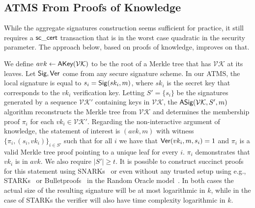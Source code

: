 \subsection{ATMS From Proofs of Knowledge}

While the aggregate signatures construction seems sufficient for practice,
it still requires a $\mathsf{sc\_cert}$ transaction that is in the worst case quadratic in
the security parameter.
The approach below, based on proofs of knowledge, improves on that.

We define $avk \gets \textsf{AKey}(\mathcal{VK})$ to be the root of a Merkle tree
that has $\mathcal{VK}$ at its leaves. Let $\mathsf{Sig}, \mathsf{Ver}$ come from any secure signature
scheme.
In our ATMS, the local signature is equal to $s_i = \mathsf{Sig}(sk_i, m)$, where
$sk_i$ is the secret key that corresponds to the $vk_i$ verification key.
Letting $S' = \{s_i\}$ be the signatures generated by a sequence $\mathcal{VK}'$
containing keys in $\mathcal{VK}$, the $\textsf{ASig}(\mathcal{VK}, S', m)$
algorithm reconstructs the Merkle tree from $\mathcal{VK}$ and determines the
membership proof $\pi_i$ for each $vk_i \in \mathcal{VK}'$. Regarding the
non-interactive argument of knowledge, the statement of interest is $(avk, m)$
with witness $\{\pi_i, (s_i, vk_i)\}_{i\in S'}$ such that for all $i$ we have that
$\mathsf{Ver}(vk_i, m, s_i) = 1$ and $\pi_i$ is a valid Merkle tree proof pointing to a
unique leaf for every $i$. $\pi_i$ demonstrates that $vk_i$ is in $avk$. We also
require $|S'| \geq t$. It is possible to construct succinct proofs for this
statement using SNARKs~\cite{snarks} or even without any trusted setup
using e.g., STARKs~\cite{ben2017scalable} or
Bulletproofs~\cite{bulletproofs} in the Random Oracle
model~\cite{ro}. In both cases the actual size of the resulting
signature will be at most logarithmic in $k$, while in the case of STARKs the
verifier will also have time complexity logarithmic in $k$.
